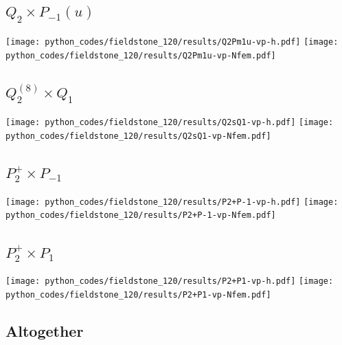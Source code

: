 \subsection*{$Q_2\times P_{-1}(u)$}
\begin{center}
\texttt{[image: python\_codes/fieldstone\_120/results/Q2Pm1u-vp-h.pdf]}
\texttt{[image: python\_codes/fieldstone\_120/results/Q2Pm1u-vp-Nfem.pdf]}
\end{center}

\subsection*{$Q_2^{(8)}\times Q_1$}
\begin{center}
\texttt{[image: python\_codes/fieldstone\_120/results/Q2sQ1-vp-h.pdf]}
\texttt{[image: python\_codes/fieldstone\_120/results/Q2sQ1-vp-Nfem.pdf]}
\end{center}

\subsection*{$P_2^+\times P_{-1}$}
\begin{center}
\texttt{[image: python\_codes/fieldstone\_120/results/P2+P-1-vp-h.pdf]}
\texttt{[image: python\_codes/fieldstone\_120/results/P2+P-1-vp-Nfem.pdf]}
\end{center}

\subsection*{$P_2^+\times P_{1}$}
\begin{center}
\texttt{[image: python\_codes/fieldstone\_120/results/P2+P1-vp-h.pdf]}
\texttt{[image: python\_codes/fieldstone\_120/results/P2+P1-vp-Nfem.pdf]}
\end{center}





\newpage
\subsection*{Altogether}


